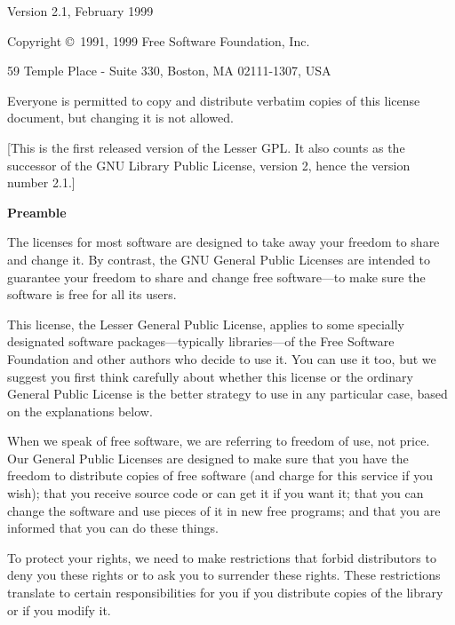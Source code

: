 \documentclass[12pt]{report}
\begin{document}
\begin{center}
{\parindent 0in

Version 2.1, February 1999

Copyright \copyright\ 1991, 1999 Free Software Foundation, Inc.

\bigskip

59 Temple Place - Suite 330, Boston, MA  02111-1307, USA

\bigskip

Everyone is permitted to copy and distribute verbatim copies
of this license document, but changing it is not allowed.

\bigskip

[This is the first released version of the Lesser GPL.  It also counts
 as the successor of the GNU Library Public License, version 2, hence
 the version number 2.1.]
}

\end{center}

\begin{center}
{\bf\large Preamble}
\end{center}

The licenses for most software are designed to take away your freedom to
share and change it.  By contrast, the GNU General Public Licenses are
intended to guarantee your freedom to share and change free software---to
make sure the software is free for all its users.

This license, the Lesser General Public License, applies to some specially
designated software packages---typically libraries---of the Free Software
Foundation and other authors who decide to use it.  You can use it too,
but we suggest you first think carefully about whether this license or the
ordinary General Public License is the better strategy to use in any
particular case, based on the explanations below.

When we speak of free software, we are referring to freedom of use, not
price.  Our General Public Licenses are designed to make sure that you
have the freedom to distribute copies of free software (and charge for
this service if you wish); that you receive source code or can get it if
you want it; that you can change the software and use pieces of it in new
free programs; and that you are informed that you can do these things.

To protect your rights, we need to make restrictions that forbid
distributors to deny you these rights or to ask you to surrender these
rights.  These restrictions translate to certain responsibilities for you
if you distribute copies of the library or if you modify it.
\end{document}
